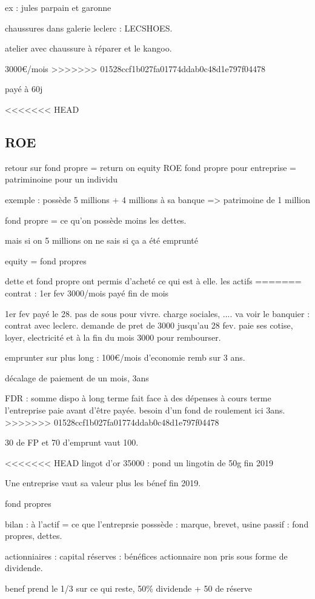 \documentclass[a4paper,12pt]{article}
\begin{document}
ex : jules parpain et garonne

chaussures dans galerie leclerc : LECSHOES.

atelier avec chaussure à réparer et le kangoo.

3000€/mois
>>>>>>> 01528ccf1b027fa01774ddab0c48d1e797f04478

payé à 60j

<<<<<<< HEAD
\subsection{ROE}
retour sur fond propre = return on equity ROE
fond propre pour entreprise = patriminoine pour un individu
 
exemple : possède  5 millions + 4 millions à sa banque
=> patrimoine de 1 million

fond propre = ce qu'on possède moins les dettes.

mais si on 5 millions on ne sais si ça a été emprunté

equity = fond propres

dette et fond propre ont permis d'acheté ce qui est à elle. les actifs
=======
contrat : 1er fev 3000/mois payé fin de mois

1er fev payé le 28. pas de sous pour vivre.
charge sociales, ....
va voir le banquier : contrat avec leclerc.
demande de pret de 3000 jusqu'au 28 fev.
paie ses cotise, loyer, electricité et à la fin du mois
3000 pour rembourser.

emprunter sur plus long : 100€/mois d'economie remb sur 3 ans.

décalage de paiement de un mois, 3ans

FDR : somme dispo à long terme fait face à des dépenses à cours terme
l'entreprise paie avant d'être payée. besoin d'un fond de roulement ici 3ans.
>>>>>>> 01528ccf1b027fa01774ddab0c48d1e797f04478

30 de FP et 70 d'emprunt vaut 100.

<<<<<<< HEAD
lingot d'or 35000 : pond un lingotin de 50g fin 2019

Une entreprise vaut sa valeur plus les bénef fin 2019.

fond propres


bilan : à l'actif = ce que l'entreprsie posssède : marque, brevet, usine
passif : fond propres, dettes.

actionniaires : capital
réserves : bénéfices actionnaire non pris sous forme de dividende.

benef prend le 1/3 sur ce qui reste, 50\% dividende + 50 de réserve
\end{document}
